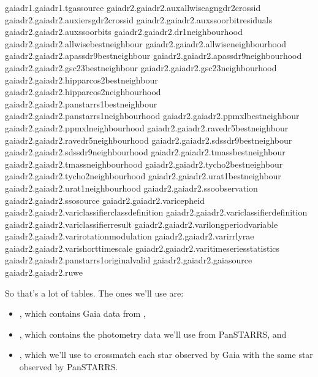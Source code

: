 \documentclass[letterpaper,10pt,english]{sphinxmanual}
\begin{document}
\begin{sphinxVerbatim}[commandchars=\\\{\}]
gaiadr1.gaiadr1.tgas\PYGZus{}source
gaiadr2.gaiadr2.aux\PYGZus{}allwise\PYGZus{}agn\PYGZus{}gdr2\PYGZus{}cross\PYGZus{}id
gaiadr2.gaiadr2.aux\PYGZus{}iers\PYGZus{}gdr2\PYGZus{}cross\PYGZus{}id
gaiadr2.gaiadr2.aux\PYGZus{}sso\PYGZus{}orbit\PYGZus{}residuals
gaiadr2.gaiadr2.aux\PYGZus{}sso\PYGZus{}orbits
gaiadr2.gaiadr2.dr1\PYGZus{}neighbourhood
gaiadr2.gaiadr2.allwise\PYGZus{}best\PYGZus{}neighbour
gaiadr2.gaiadr2.allwise\PYGZus{}neighbourhood
gaiadr2.gaiadr2.apassdr9\PYGZus{}best\PYGZus{}neighbour
gaiadr2.gaiadr2.apassdr9\PYGZus{}neighbourhood
gaiadr2.gaiadr2.gsc23\PYGZus{}best\PYGZus{}neighbour
gaiadr2.gaiadr2.gsc23\PYGZus{}neighbourhood
gaiadr2.gaiadr2.hipparcos2\PYGZus{}best\PYGZus{}neighbour
gaiadr2.gaiadr2.hipparcos2\PYGZus{}neighbourhood
gaiadr2.gaiadr2.panstarrs1\PYGZus{}best\PYGZus{}neighbour
gaiadr2.gaiadr2.panstarrs1\PYGZus{}neighbourhood
gaiadr2.gaiadr2.ppmxl\PYGZus{}best\PYGZus{}neighbour
gaiadr2.gaiadr2.ppmxl\PYGZus{}neighbourhood
gaiadr2.gaiadr2.ravedr5\PYGZus{}best\PYGZus{}neighbour
gaiadr2.gaiadr2.ravedr5\PYGZus{}neighbourhood
gaiadr2.gaiadr2.sdssdr9\PYGZus{}best\PYGZus{}neighbour
gaiadr2.gaiadr2.sdssdr9\PYGZus{}neighbourhood
gaiadr2.gaiadr2.tmass\PYGZus{}best\PYGZus{}neighbour
gaiadr2.gaiadr2.tmass\PYGZus{}neighbourhood
gaiadr2.gaiadr2.tycho2\PYGZus{}best\PYGZus{}neighbour
gaiadr2.gaiadr2.tycho2\PYGZus{}neighbourhood
gaiadr2.gaiadr2.urat1\PYGZus{}best\PYGZus{}neighbour
gaiadr2.gaiadr2.urat1\PYGZus{}neighbourhood
gaiadr2.gaiadr2.sso\PYGZus{}observation
gaiadr2.gaiadr2.sso\PYGZus{}source
gaiadr2.gaiadr2.vari\PYGZus{}cepheid
gaiadr2.gaiadr2.vari\PYGZus{}classifier\PYGZus{}class\PYGZus{}definition
gaiadr2.gaiadr2.vari\PYGZus{}classifier\PYGZus{}definition
gaiadr2.gaiadr2.vari\PYGZus{}classifier\PYGZus{}result
gaiadr2.gaiadr2.vari\PYGZus{}long\PYGZus{}period\PYGZus{}variable
gaiadr2.gaiadr2.vari\PYGZus{}rotation\PYGZus{}modulation
gaiadr2.gaiadr2.vari\PYGZus{}rrlyrae
gaiadr2.gaiadr2.vari\PYGZus{}short\PYGZus{}timescale
gaiadr2.gaiadr2.vari\PYGZus{}time\PYGZus{}series\PYGZus{}statistics
gaiadr2.gaiadr2.panstarrs1\PYGZus{}original\PYGZus{}valid
gaiadr2.gaiadr2.gaia\PYGZus{}source
gaiadr2.gaiadr2.ruwe
\end{sphinxVerbatim}

So that’s a lot of tables.  The ones we’ll use are:
\begin{itemize}
\item {} 
, which contains Gaia data from ,

\item {} 
, which contains the photometry data we’ll use from PanSTARRS, and

\item {} 
, which we’ll use to cross\sphinxhyphen{}match each star observed by Gaia with the same star observed by PanSTARRS.

\end{itemize}
\end{document}
